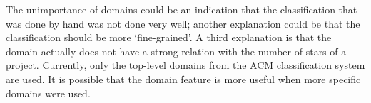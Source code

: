      The unimportance of domains could be an indication that the classification that was done by hand was not done very well; another explanation could be that the classification should be more `fine-grained'. A third explanation is that the domain actually does not have a strong relation with the number of stars of a project.
     Currently, only the top-level domains from the ACM classification system are used. It is possible that the domain feature is more useful when more specific domains were used.
